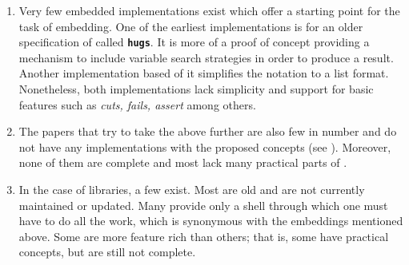\documentclass[thesis-solanki.tex]{subfiles}
\begin{document}
\begin{enumerate}
\item
  Very few embedded implementations exist which offer a starting point for the task of embedding.
  One of the earliest implementations \cite{website:mini-prolog-hugs98} is for an older specification of
   called  \texttt{\bfseries{hugs}}.
  It is more of a proof of concept providing a mechanism to include variable search strategies in order to produce
  a result.
  Another implementation \cite{website:takashi-workplace} based of it simplifies the notation to a list format.
  Nonetheless, both implementations lack simplicity and support for basic  features such as
  \textit{cuts, fails, assert} among others.

\begin{comment}
\item
  Only two embeddings exist, one of them is old and made for \texttt{\bfseries{hugs}} a functional programming
  system based on the \progLang{Haskell 98} specification.
  It is complex and also lacks a lot of \progLang{Prolog} like\eref{language-like} features including \textit{cuts, fails, assert}
  among others.
  The second one is based off the first one to make it simple but it loses the variable search strategy support
  which allows the programmer to choose the manner in which a solution is produced.
\end{comment}

\item
  The papers that try to take the above further are also few in number and do not have any implementations with the
  proposed concepts (see \cite{spivey1999embedding, seres1999algebra, seres2001algebra, spivey2000functional,
    seres2000optimisation}).
  Moreover, none of them are complete and most lack many practical parts of .

\item
  In the case of libraries, a few exist.
  Most are old and are not currently maintained or updated.
  Many provide only a shell through which one must have to do all the work, which is synonymous with
  the embeddings mentioned above.
  Some are more feature rich than others; that is, some have practical  concepts,
  but are still not complete.


\end{enumerate}
\end{document}

